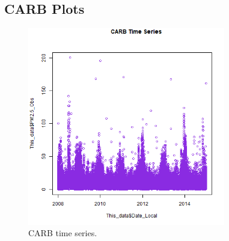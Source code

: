 
\subsection{CARB Plots}
\begin{figure} 
\centering 
\includegraphics[width=0.77\textwidth]{Code_Outputs/CARB_time_series.png} 
\caption{\label{fig:CARBTS}CARB time series.} 
\end{figure} 
 
